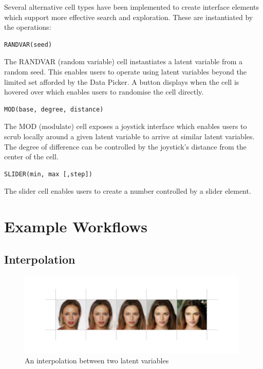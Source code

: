 \documentclass[letterpaper]{article}
\begin{document}
Several alternative cell types have been implemented to create interface elements which support more effective search and exploration. These are instantiated by the operations:

\begin{verbatim}
RANDVAR(seed)
\end{verbatim}
The RANDVAR (random variable) cell instantiates a latent variable from a random seed. This enables users to operate using latent variables beyond the limited set afforded by the Data Picker. A button displays when the cell is hovered over which enables users to randomise the cell directly.

\begin{verbatim}
MOD(base, degree, distance)
\end{verbatim}
The MOD (modulate) cell exposes a joystick interface which enables users to scrub locally around a given latent variable to arrive at similar latent variables. The degree of difference can be controlled by the joystick’s distance from the center of the cell.

\begin{verbatim}
SLIDER(min, max [,step])
\end{verbatim}
The slider cell enables users to create a number controlled by a slider element.

\newpage 
\section*{Example Workflows}

\setcounter{secnumdepth}{0}

\subsection{Interpolation}
\begin{figure}[ht!]
  \centering
  \includegraphics[width=11.0cm]{figs/04-interpolation-strip.jpg}
  \caption{An interpolation between two latent variables}
\end{figure}
\end{document}
